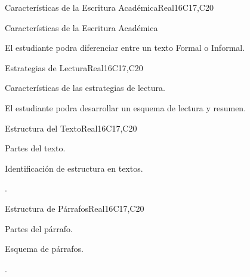 \begin{syllabus}
\begin{unit}{Características de la Escritura Académica}{}{Real}{16}{C17,C20}
  \begin{topics}
      \item Características de la Escritura Académica
  \end{topics}

  \begin{learningoutcomes}
   \item El estudiante podra diferenciar entre un texto Formal o Informal.
  \end{learningoutcomes}
\end{unit}

\begin{unit}{Estrategias de Lectura}{}{Real}{16}{C17,C20}
  \begin{topics}
      \item Características de las estrategias de lectura.
  \end{topics}

  \begin{learningoutcomes}
   \item El estudiante podra desarrollar  un esquema de lectura y resumen.
  \end{learningoutcomes}
\end{unit}

\begin{unit}{Estructura del Texto}{}{Real}{16}{C17,C20}
  \begin{topics}
      \item Partes del texto.
      \item Identificación de estructura en textos.
  \end{topics}

  \begin{learningoutcomes}
   \item .%
  \end{learningoutcomes}
\end{unit}

\begin{unit}{Estructura de Párrafos}{}{Real}{16}{C17,C20}
  \begin{topics}
      \item Partes del párrafo.
      \item Esquema de párrafos.
  \end{topics}

  \begin{learningoutcomes}
   \item .%
  \end{learningoutcomes}
\end{unit}


\end{syllabus}
